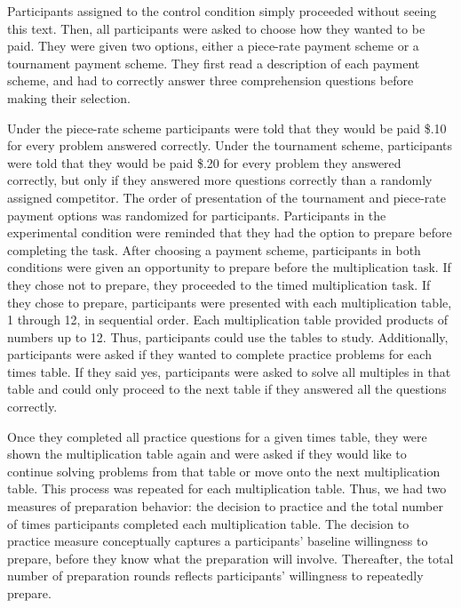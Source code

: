 \documentclass[a4paper, nobind]{templates/ociamthesis}
\begin{document}
Participants assigned to the control condition simply proceeded without seeing this text. Then, all participants were asked to choose how they wanted to be paid. They were given two options, either a piece-rate payment scheme or a tournament payment scheme. They first read a description of each payment scheme, and had to correctly answer three comprehension questions before making their selection.

Under the piece-rate scheme participants were told that they would be paid \$.10 for every problem answered correctly. Under the tournament scheme, participants were told that they would be paid \$.20 for every problem they answered correctly, but only if they answered more questions correctly than a randomly assigned competitor. The order of presentation of the tournament and piece-rate payment options was randomized for participants. Participants in the experimental condition were reminded that they had the option to prepare before completing the task. After choosing a payment scheme, participants in both conditions were given an opportunity to prepare before the multiplication task. If they chose not to prepare, they proceeded to the timed multiplication task. If they chose to prepare, participants were presented with each multiplication table, 1 through 12, in sequential order. Each multiplication table provided products of numbers up to 12. Thus, participants could use the tables to study. Additionally, participants were asked if they wanted to complete practice problems for each times table. If they said yes, participants were asked to solve all multiples in that table and could only proceed to the next table if they answered all the questions correctly.

Once they completed all practice questions for a given times table, they were shown the multiplication table again and were asked if they would like to continue solving problems from that table or move onto the next multiplication table. This process was repeated for each multiplication table. Thus, we had two measures of preparation behavior: the decision to practice and the total number of times participants completed each multiplication table. The decision to practice measure conceptually captures a participants' baseline willingness to prepare, before they know what the preparation will involve. Thereafter, the total number of preparation rounds reflects participants' willingness to repeatedly prepare.
\end{document}
